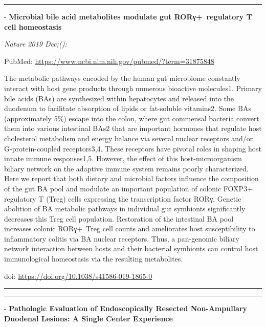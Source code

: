 \documentclass[
]{article}
\renewcommand{\linethickness}{0.05em}
\begin{document}
\begin{center}\rule{0.5\linewidth}{\linethickness}\end{center}

- \textbf{Microbial bile acid metabolites modulate gut RORγ+~regulatory
T cell homeostasis}

\emph{Nature 2019 Dec;():}

PubMed: \url{https://www.ncbi.nlm.nih.gov/pubmed/?term=31875848}

The metabolic pathways encoded by the human gut microbiome constantly
interact with host gene products through numerous bioactive molecules1.
Primary bile acids (BAs) are synthesized within hepatocytes and released
into the duodenum to facilitate absorption of lipids or fat-soluble
vitamins2. Some BAs (approximately 5\%) escape into the colon, where gut
commensal bacteria convert them into various intestinal BAs2 that are
important hormones that regulate host cholesterol metabolism and energy
balance via several nuclear receptors and/or G-protein-coupled
receptors3,4. These receptors have pivotal roles in shaping host innate
immune responses1,5. However, the effect of this host-microorganism
biliary network on the adaptive immune system remains poorly
characterized. Here we report that both dietary and microbial factors
influence the composition of the gut BA pool and modulate an important
population of colonic FOXP3+ regulatory T (Treg) cells expressing the
transcription factor RORγ. Genetic abolition of BA metabolic pathways in
individual gut symbionts significantly decreases this Treg cell
population. Restoration of the intestinal BA pool increases colonic
RORγ+~Treg cell counts and ameliorates host susceptibility to
inflammatory colitis via BA nuclear receptors. Thus, a pan-genomic
biliary network interaction between hosts and their bacterial symbionts
can control host immunological homeostasis via the resulting
metabolites.

doi: \url{https://doi.org/10.1038/s41586-019-1865-0}

\begin{center}\rule{0.5\linewidth}{\linethickness}\end{center}

\begin{center}\rule{0.5\linewidth}{\linethickness}\end{center}

- \textbf{Pathologic Evaluation of Endoscopically Resected Non-Ampullary
Duodenal Lesions: A Single Center Experience}
\end{document}
